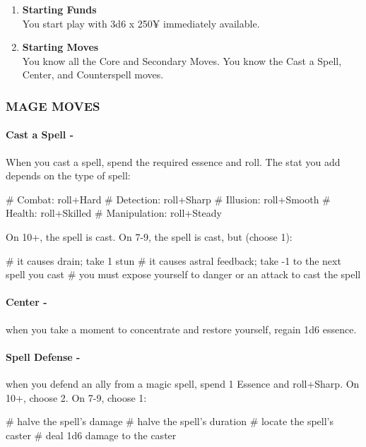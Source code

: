 \begin{enumerate}
    \item \textbf{Starting Funds} \\
    You start play with 3d6 x 250¥ immediately available.
    
    \item \textbf{Starting Moves} \\
    You know all the Core and Secondary Moves. You know the Cast a Spell, Center, and Counterspell moves.
\end{enumerate}

\subsubsection{MAGE MOVES}
\paragraph{Cast a Spell -} When you cast a spell, spend the required essence and roll. The stat you add depends on the type of spell:
    \begin{easylist}
        # Combat: roll+Hard
        # Detection: roll+Sharp
        # Illusion: roll+Smooth
        # Health: roll+Skilled
        # Manipulation: roll+Steady
    \end{easylist}        
On 10+, the spell is cast. On 7-9, the spell is cast, but (choose 1):
    \begin{easylist}
        # it causes drain; take 1 stun
        # it causes astral feedback; take -1 to the next spell you cast
        # you must expose yourself to danger or an attack to cast the spell
    \end{easylist}

\paragraph{Center -} when you take a moment to concentrate and restore yourself, regain 1d6 essence.

\paragraph{Spell Defense -} when you defend an ally from a magic spell, spend 1 Essence and roll+Sharp. On 10+, choose 2. On 7-9, choose 1:
    \begin{easylist}
        # halve the spell’s damage
        # halve the spell’s duration
        # locate the spell’s caster
        # deal 1d6 damage to the caster
    \end{easylist}

